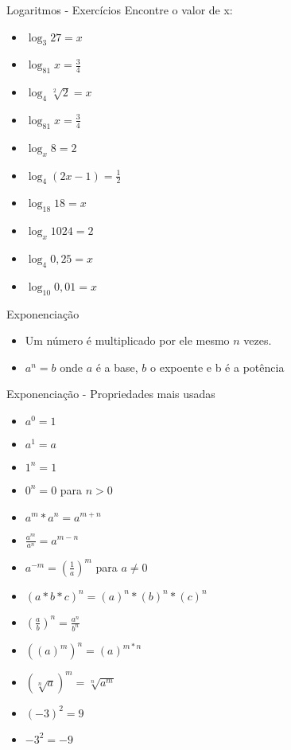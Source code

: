 \begin{frame}
	\begin{block}{Logaritmos - Exercícios}
		Encontre o valor de x:
		\begin{itemize}
			\item $\log_3 27 = x$
			\item $\log_{81} x = \frac{3}{4}$
			\item $\log_4 \sqrt[2]{2} = x$
			\item $\log_{81} x = \frac{3}{4}$
			\item $\log_x 8 = 2$
			\item $\log_4 (2x-1) = \frac{1}{2}$
			\item $\log_{18} 18 = x$
			\item $\log_x 1024 = 2$
			\item $\log_4 0,25 =x$
			\item $\log_{10} 0,01 = x$
		\end{itemize}
	\end{block}
\end{frame}

\begin{frame}
	\begin{block}{Exponenciação}
		\begin{itemize}
			\item Um número é multiplicado por ele mesmo $n$ vezes.
			\item $a^{n} = b$ onde $a$ é a base, $b$ o expoente e b é  a potência
		\end{itemize}
	\end{block}
\end{frame}

\begin{frame}
	\begin{block}{Exponenciação - Propriedades mais usadas}
		\begin{itemize}
			\item $a^{0} = 1$
			\item $a^{1} = a$
			\item $1^{n} = 1$
			\item $0^{n} = 0$ para $n > 0$
			\item $a^{m} * a^{n} = a^{m+n}$
			\item $ \frac{a^{m}}{a^{n}} = a^{m-n}$
			\item $ a^{-m} = \left( \frac{1}{a} \right)^{m}$ para $a \neq 0$
			\item $ (a*b*c)^{n} = (a)^{n} * (b)^{n} * (c)^{n}$
			\item $ \left( \frac{a}{b} \right)^{n}= \frac{a^{n}}{b^{n}}$
			\item $((a)^{m})^{n} = (a)^{m*n}$
			\item $ (\sqrt[n]{a})^{m} = \sqrt[n]{a^{m}}$
			\item $ (-3)^{2} = 9$
			\item $ -3^{2} = -9$
		\end{itemize}
	\end{block}
\end{frame}

